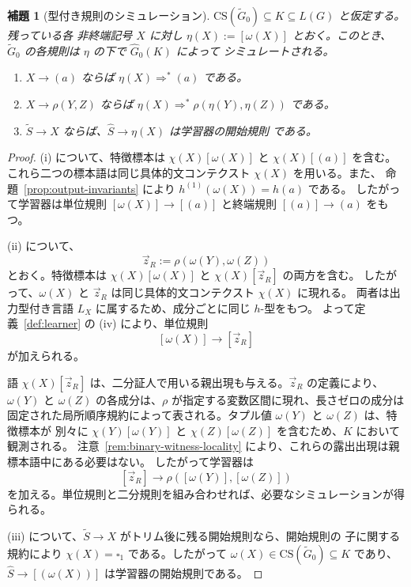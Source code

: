 \documentclass[11pt,a4paper]{ltjsarticle}
\newtheorem{lemma}[theorem]{補題}
\theoremstyle{remark}
\newcommand{\CS}{\mathrm{CS}}
\newcommand{\tuple}[1]{\vec{#1}}
\newcommand{\blank}{\square}
\begin{document}
\begin{lemma}[型付き規則のシミュレーション]
\label{lem:rule-simulation}
\(\CS(\widetilde G_0)\subseteq K\subseteq L(G)\) と仮定する。残っている各
非終端記号 \(X\) に対し \(\eta(X):=[\omega(X)]\) とおく。このとき、
\(\widetilde G_0\) の各規則は \(\eta\) の下で \(\widehat G_0(K)\) によって
シミュレートされる。
\begin{enumerate}[label=(\roman*),leftmargin=*]
\item \(X\to(a)\) ならば \(\eta(X)\Rightarrow^*(a)\) である。
\item \(X\to\rho(Y,Z)\) ならば
\(\eta(X)\Rightarrow^*\rho(\eta(Y),\eta(Z))\) である。
\item \(\widetilde S\to X\) ならば、\(\widehat S\to\eta(X)\) は学習器の開始規則
である。
\end{enumerate}
\end{lemma}

\begin{proof}
(i) について、特徴標本は \(\chi(X)[\omega(X)]\) と \(\chi(X)[(a)]\) を含む。
これら二つの標本語は同じ具体的文コンテクスト \(\chi(X)\) を用いる。また、
命題~\ref{prop:output-invariants} により \(h^{(1)}(\omega(X))=h(a)\) である。
したがって学習器は単位規則 \([\omega(X)]\to[(a)]\) と終端規則
\([(a)]\to(a)\) をもつ。

(ii) について、
\[
  \tuple z_R:=\rho(\omega(Y),\omega(Z))
\]
とおく。特徴標本は \(\chi(X)[\omega(X)]\) と \(\chi(X)[\tuple z_R]\) の両方を含む。
したがって、\(\omega(X)\) と \(\tuple z_R\) は同じ具体的文コンテクスト \(\chi(X)\) に現れる。
両者は出力型付き言語 \(L_X\) に属するため、成分ごとに同じ \(h\)-型をもつ。
よって定義~\ref{def:learner} の (iv) により、単位規則
\[
  [\omega(X)]\to[\tuple z_R]
\]
が加えられる。

語 \(\chi(X)[\tuple z_R]\) は、二分証人で用いる親出現も与える。\(\tuple z_R\) の定義により、
\(\omega(Y)\) と \(\omega(Z)\) の各成分は、\(\rho\) が指定する変数区間に現れ、長さゼロの成分は
固定された局所順序規約によって表される。タプル値 \(\omega(Y)\) と \(\omega(Z)\) は、特徴標本が
別々に \(\chi(Y)[\omega(Y)]\) と \(\chi(Z)[\omega(Z)]\) を含むため、\(K\) において観測される。
注意~\ref{rem:binary-witness-locality} により、これらの露出出現は親標本語中にある必要はない。
したがって学習器は
\[
  [\tuple z_R]\to\rho([\omega(Y)],[\omega(Z)])
\]
を加える。単位規則と二分規則を組み合わせれば、必要なシミュレーションが得られる。

(iii) について、\(\widetilde S\to X\) がトリム後に残る開始規則なら、開始規則の
子に関する規約により \(\chi(X)=\blank_1\) である。したがって
\(\omega(X)\in\CS(\widetilde G_0)\subseteq K\) であり、
\(\widehat S\to[(\omega(X))]\) は学習器の開始規則である。
\end{proof}
\end{document}

